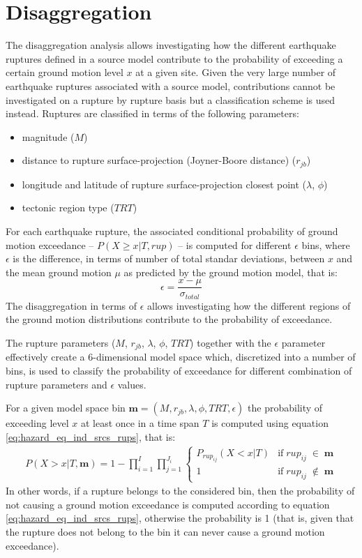 \section{Disaggregation}
The disaggregation analysis allows investigating how the different earthquake ruptures defined in a source model
contribute to the probability of exceeding a certain ground motion level $x$ at a given site. Given the very
large number of earthquake ruptures associated with a source model, contributions cannot be investigated on a rupture by
rupture basis but a classification scheme is used instead. Ruptures are classified in terms of the following parameters:
\begin{itemize}
	\item magnitude ($M$)
	\item distance to rupture surface-projection (Joyner-Boore distance) ($r_{jb}$)
	\item longitude and latitude of rupture surface-projection closest point ($\lambda$, $\phi$)
	\item tectonic region type ($TRT$)
\end{itemize}
For each earthquake rupture, the associated conditional probability of ground motion exceedance -- $P(X \ge x | T, rup)$ -- is computed
for different $\epsilon$ bins, where $\epsilon$ is the difference, in terms of number of total standar deviations,
between $x$ and the mean ground motion $\mu$ as predicted by the ground motion model, that is:
\begin{equation}
\epsilon = \frac{x - \mu}{\sigma_{total}}
\end{equation}
The disaggregation in terms of $\epsilon$ allows investigating how the different regions of the ground motion distributions
contribute to the probability of exceedance.

The rupture parameters ($M$, $r_{jb}$, $\lambda$, $\phi$, $TRT$) together with the $\epsilon$ parameter effectively
create a 6-dimensional model space which, discretized into a number of bins, is used to classify the probability
of exceedance for different combination of rupture parameters and $\epsilon$ values.

For a given model space bin $\bm{m} = (M, r_{jb}, \lambda, \phi, TRT, \epsilon)$ the probability of
exceeding level $x$ at least once in a time span $T$ is computed using equation \ref{eq:hazard_eq_ind_srcs_rups}, that is:
\begin{align}
\label{eq:disagg}
P(X > x | T, \bm{m}) =
	1 - \prod_{i=1}^{I}\prod_{j=1}^{J_{i}}
	\begin{cases} P_{rup_{ij}}(X < x | T) & \mbox{if}\;rup_{ij}\;\in\;\bm{m}\\
			      1 & \mbox{if}\;rup_{ij}\;\notin\;\bm{m}
	\end{cases}
\end{align}
In other words, if a rupture belongs to the considered bin, then the probability of not causing a ground motion exceedance is computed
according to equation \ref{eq:hazard_eq_ind_srcs_rups}, otherwise the probability is 1 (that is, given that the rupture does not belong to the bin it can never cause a ground motion exceedance).

